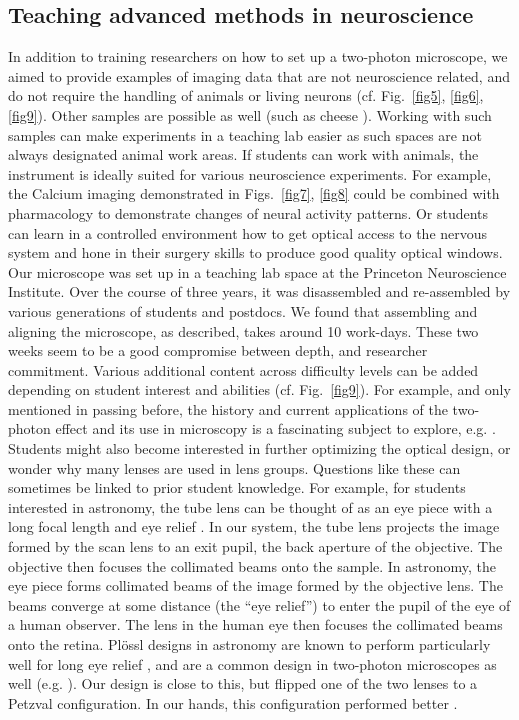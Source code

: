 \documentclass[10pt,letterpaper]{article}
\begin{document}
\subsection*{Teaching advanced methods in neuroscience}
In addition to training researchers on how to set up a two-photon microscope, we aimed to provide examples of imaging data that are not neuroscience related, and do not require the handling of animals or living neurons (cf. Fig.~\ref{fig5}, \ref{fig6}, \ref{fig9}). Other samples are possible as well (such as cheese \cite{Nguyen2001}). Working with such samples can make experiments in a teaching lab easier as such spaces are not always designated animal work areas. If students can work with animals, the instrument is ideally suited for various neuroscience experiments. For example, the Calcium imaging demonstrated in Figs.~\ref{fig7}, \ref{fig8} could be combined with pharmacology to demonstrate changes of neural activity patterns. Or students can learn in a controlled environment how to get optical access to the nervous system and hone in their surgery skills to produce good quality optical windows\cite{Holtmaat2009, Grienberger2022}.
Our microscope was set up in a teaching lab space at the Princeton Neuroscience Institute. Over the course of three years, it was disassembled and re-assembled by various generations of students and postdocs. We found that assembling and aligning the microscope, as described, takes around 10 work-days. These two weeks seem to be a good compromise between depth, and researcher commitment. Various additional content across difficulty levels can be added depending on student interest and abilities (cf. Fig.~\ref{fig9}). For example, and only mentioned in passing before, the history and current applications of the two-photon effect and its use in microscopy is a fascinating subject to explore, e.g. \cite{Sheppard2020, Yao2023}.\newline 
Students might also become interested in further optimizing the optical design, or wonder why many lenses are used in lens groups. Questions like these can sometimes be linked to prior student knowledge. For example, for students interested in astronomy, the tube lens can be thought of as an eye piece with a long focal length and eye relief \cite{Smith2007}. In our system, the tube lens projects the image formed by the scan lens to an exit pupil, the back aperture of the objective. The objective then focuses the collimated beams onto the sample. In astronomy, the eye piece forms collimated beams of the image formed by the objective lens. The beams converge at some distance (the ``eye relief'') to enter the pupil of the eye of a human observer. The lens in the human eye then focuses the collimated beams onto the retina. Pl\"ossl designs in astronomy are known to perform particularly well for long eye relief \cite{Smith2007, Nagler1983}, and are a common design in two-photon microscopes as well (e.g. \cite{Rupprecht2024}). Our design is close to this, but flipped one of the two lenses to a Petzval configuration. In our hands, this configuration performed better \cite{Hong2022, Bumstead2018, Mayrhofer2015}.\newline
\end{document}

